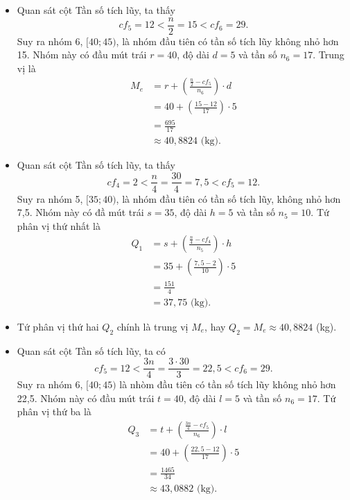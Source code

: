 \documentclass[
  letterpaper,
  DIV=11,
  numbers=noendperiod]{scrartcl}
\providecommand{\tightlist}{%
  \setlength{\itemsep}{0pt}\setlength{\parskip}{0pt}}\usepackage{longtable,booktabs,array}
\begin{document}
\begin{itemize}
\tightlist
\item
  Quan sát cột Tần số tích lũy, ta thấy \[
  cf_5=12 < \frac{n}{2}=15 < cf_6=29.
  \] Suy ra nhóm 6, \([40;45)\), là nhóm đầu tiên có tần số tích lũy
  không nhỏ hơn 15. Nhóm này có đầu mút trái \(r=40\), độ dài \(d=5\) và
  tần số \(n_6=17\). Trung vị là \begin{align*}
  M_e
    & = r + \left(\frac{\frac{n}{2}-cf_5}{n_6}\right)\cdot d \\
    & = 40 + \left(\frac{15-12}{17}\right)\cdot 5 \\
    & = \frac{695}{17} \\
    & \approx 40,8824 \text{ (kg).}
  \end{align*}
\end{itemize}

\begin{itemize}
\item
  Quan sát cột Tần số tích lũy, ta thấy \[
  cf_4=2 <\frac{n}{4}=\frac{30}{4}=7,5 < cf_5=12.
  \] Suy ra nhóm 5, \([35;40)\), là nhóm đầu tiên có tần số tích lũy,
  không nhỏ hơn 7,5. Nhóm này có đầ mút trái \(s=35\), độ dài \(h=5\) và
  tần số \(n_5=10\). Tứ phân vị thứ nhất là \begin{align*}
        Q_1
            & = s + \left( \frac{\frac{n}{4}-cf_4}{n_5}\right)\cdot h \\
            & = 35 + \left(\frac{7,5-2}{10}\right)\cdot 5 \\
            & = \frac{151}{4} \\
            & = 37,75 \text{ (kg).}
    \end{align*}
\item
  Tứ phân vị thứ hai \(Q_2\) chính là trung vị \(M_e\), hay
  \(Q_2=M_e \approx 40,8824\) (kg).
\end{itemize}

\begin{itemize}
\tightlist
\item
  Quan sát cột Tần số tích lũy, ta có \[
  cf_5=12<\frac{3n}{4}=\frac{3\cdot 30}{3}=22,5<cf_6=29.
  \] Suy ra nhóm 6, \([40;45)\) là nhòm đầu tiên có tần số tích lũy
  không nhỏ hơn 22,5. Nhóm này có đầu mút trái \(t=40\), độ dài \(l=5\)
  và tần số \(n_6=17\). Tứ phân vị thứ ba là \begin{align*}
        Q_3
            & = t + \left(\frac{\frac{3n}{4}-cf_5}{n_6}\right)\cdot l \\
            & = 40 +\left(\frac{22,5-12}{17}\right) \cdot 5 \\
            & = \frac{1465}{34} \\
            & \approx 43,0882 \text{ (kg).} 
    \end{align*}
\end{itemize}
\end{document}
